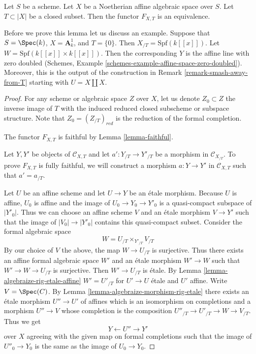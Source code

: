 \begin{lemma}
\label{lemma-dilatations-affine}
Let $S$ be a scheme. Let $X$ be a Noetherian affine algebraic space over $S$.
Let $T \subset |X|$ be a closed subset. Then the functor $F_{X, T}$ is an
equivalence.
\end{lemma}

\noindent
Before we prove this lemma let us discuss an example. Suppose that
$S = \Spec(k)$, $X = \mathbf{A}^1_k$, and $T = \{0\}$. Then
$X_{/T} = \text{Spf}(k[[x]])$. Let $W = \text{Spf}(k[[x]] \times k[[x]])$.
Then the corresponding $Y$ is the affine line with zero doubled
(Schemes, Example \ref{schemes-example-affine-space-zero-doubled}).
Moreover, this is the output of the construction in
Remark \ref{remark-smash-away-from-T}
starting with $U = X \amalg X$.

\begin{proof}
For any scheme or algebraic space $Z$ over $X$, let us denote
$Z_0 \subset Z$ the inverse image of $T$ with the induced reduced
closed subscheme or subspace structure. Note that $Z_0 = (Z_{/T})_{red}$
is the reduction of the formal completion.

\medskip\noindent
The functor $F_{X, T}$ is faithful by Lemma \ref{lemma-faithful}.

\medskip\noindent
Let $Y, Y'$ be objects of $\mathcal{C}_{X, T}$ and let
$a' : Y_{/T} \to Y'_{/T}$ be a morphism in $\mathcal{C}_{X_{/T}}$.
To prove $F_{X, T}$ is fully faithful, we will construct a morphism
$a : Y \to Y'$ in $\mathcal{C}_{X, T}$ such that $a' = a_{/T}$.

\medskip\noindent
Let $U$ be an affine scheme and let $U \to Y$ be an \'etale morphism.
Because $U$ is affine, $U_0$ is affine and the image of
$U_0 \to Y_0 \to Y'_0$ is a quasi-compact subspace of $|Y'_0|$.
Thus we can choose an affine scheme $V$ and an \'etale morphism
$V \to Y'$ such that the image of $|V_0| \to |Y'_0|$
contains this quasi-compact subset. Consider the formal algebraic space
$$
W = U_{/T} \times_{Y'_{/T}} V_{/T}
$$
By our choice of $V$ the above, the map $W \to U_{/T}$ is surjective.
Thus there exists an affine formal algebraic space $W'$ and an \'etale
morphism $W' \to W$ such that $W' \to W \to U_{/T}$ is surjective.
Then $W' \to U_{/T}$ is \'etale.
By Lemma \ref{lemma-algebraize-rig-etale-affine} $W' = U'_{/T}$
for $U' \to U$ \'etale and $U'$ affine. Write $V = \Spec(C)$. By
Lemma \ref{lemma-algebraize-morphism-rig-etale} there exists an
\'etale morphism $U'' \to U'$ of affines which is an isomorphism on
completions and a morphism $U'' \to V$ whose completion is
the composition $U''_{/T} \to U'_{/T} \to W \to V_{/T}$.
Thus we get
$$
Y \longleftarrow U'' \longrightarrow Y'
$$
over $X$ agreeing with the given map on formal completions such that
the image of $U''_0 \to Y_0$ is the same as the image of $U_0 \to Y_0$.


\end{proof}

